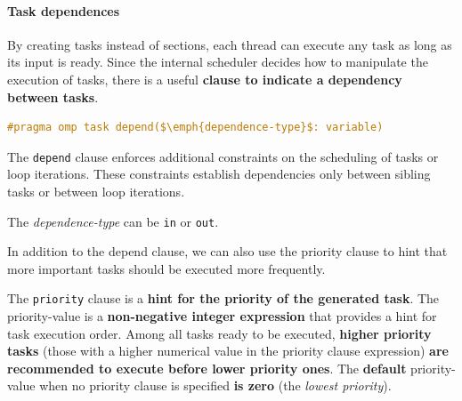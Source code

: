 \paragraph{Task dependences}

By creating tasks instead of sections, each thread can execute any task as long as its input is ready. Since the internal scheduler decides how to manipulate the execution of tasks, there is a useful \textbf{clause to indicate a dependency between tasks}.
\begin{openmpbox}
    \begin{lstlisting}[language=C++, mathescape=true]
#pragma omp task depend($\emph{dependence-type}$: variable)\end{lstlisting}
    The \texttt{depend} clause enforces additional constraints on the scheduling of tasks or loop iterations. These constraints establish dependencies only between sibling tasks or between loop iterations.

    The \emph{dependence-type} can be \texttt{in} or \texttt{out}.
\end{openmpbox}

\noindent
In addition to the depend clause, we can also use the priority clause to hint that more important tasks should be executed more frequently.

\highspace
The \texttt{priority} clause is a \textbf{hint for the priority of the generated task}. The priority-value is a \textbf{non-negative integer expression} that provides a hint for task execution order. Among all tasks ready to be executed, \textbf{higher priority tasks} (those with a higher numerical value in the priority clause expression) \textbf{are recommended to execute before lower priority ones}. The \textbf{default} priority-value when no priority clause is specified \textbf{is zero} (the \emph{lowest priority}).

